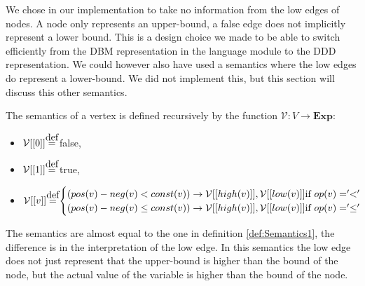 We chose in our implementation to take no information from the low edges of nodes. A node only represents an upper-bound, a false edge does not implicitly represent a lower bound. This is a design choice we made to be able to switch efficiently from the DBM representation in the language module to the DDD representation. We could however also have used a semantics where the low edges do represent a lower-bound. We did not implement this, but this section will discuss this other semantics.

\begin{mydef}
\label{def:Semantics2}
The semantics of a vertex is defined recursively by the function $\mathcal{V}: V \rightarrow \textbf{Exp}:$
\begin{itemize}
\item $\mathcal{V}[[0]] \myeq$ false,
\item $\mathcal{V}[[1]] \myeq$ true,
\item \begin{math} \mathcal{V}[[v]] \myeq
\begin{cases}
(pos(v) - neg(v) < const(v)) \rightarrow \mathcal{V}[[high(v)]],\mathcal{V}[[low(v)]]\text{if }op(v) = '<'\\
(pos(v) - neg(v) \leq const(v)) \rightarrow \mathcal{V}[[high(v)]],\mathcal{V}[[low(v)]]\text{if }op(v) = '\leq'
\end{cases}
\end{math}

\end{itemize}

\end{mydef}
The semantics are almost equal to the one in definition \ref{def:Semantics1}, the difference is in the interpretation of the low edge. In this semantics the low edge does not just represent that the upper-bound is higher than the bound of the node, but the actual value of the variable is higher than the bound of the node. 

